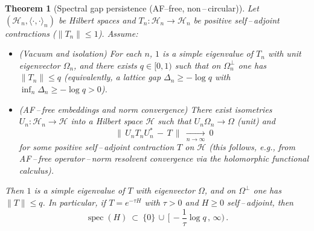 \documentclass[11pt]{amsart}
\theoremstyle{plain}
\newtheorem{theorem}{Theorem}[section]
\theoremstyle{definition}
\theoremstyle{remark}
\renewcommand{\tfrac}[2]{\textstyle\frac{#1}{#2}}
\begin{document}
\begin{theorem}[Spectral gap persistence (AF--free, non\,–\,circular)]\label{thm:gap-persist-cont}
Let $(\mathcal H_n,\langle\cdot,\cdot\rangle_n)$ be Hilbert spaces and $T_n:\mathcal H_n\to\mathcal H_n$ be positive self\,–\,adjoint contractions ($\|T_n\|\le 1$). Assume:
\begin{itemize}
  \item[(i)] (Vacuum and isolation) For each $n$, $1$ is a simple eigenvalue of $T_n$ with unit eigenvector $\Omega_n$, and there exists $q\in[0,1)$ such that on $\Omega_n^{\perp}$ one has $\|T_n\|\le q$ (equivalently, a lattice gap $\Delta_n\ge -\log q$ with $\inf_n\Delta_n\ge -\log q>0$).
  \item[(ii)] (AF\,–\,free embeddings and norm convergence) There exist isometries $U_n:\mathcal H_n\to\mathcal H$ into a Hilbert space $\mathcal H$ such that $U_n\Omega_n\to\Omega$ (unit) and
  \[
    \big\|\,U_n T_n U_n^*\,-\,T\,\big\|\ \xrightarrow[n\to\infty]{}\ 0
  \]
  for some positive self\,–\,adjoint contraction $T$ on $\mathcal H$ (this follows, e.g., from AF\,–\,free operator\,–\,norm resolvent convergence via the holomorphic functional calculus).
\end{itemize}
Then $1$ is a simple eigenvalue of $T$ with eigenvector $\Omega$, and on $\Omega^{\perp}$ one has $\|T\|\le q$. In particular, if $T=e^{-\tau H}$ with $\tau>0$ and $H\ge 0$ self\,–\,adjoint, then
\[
  \operatorname{spec}(H)\ \subset\ \{0\}\,\cup\,\big[\,-\tfrac{1}{\tau}\log q\,,\,\infty\big)\,.
\]
\end{theorem}
\end{document}
